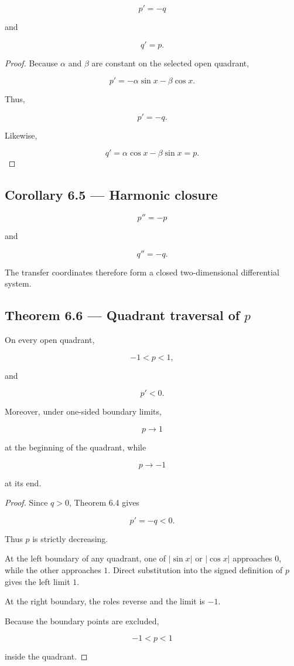 \documentclass[11pt,oneside,openany]{book}
\newcommand{\PCsubsection}[1]{%
  \subsection*{#1}%
}
\begin{document}
\[
\boxed{ p'=-q }
\]

and

\[
\boxed{ q'=p }.
\]

\begin{proof}
Because \(\alpha\) and \(\beta\) are constant on the selected open quadrant,

\[
p' = -\alpha\sin x-\beta\cos x.
\]

Thus,

\[
p'=-q.
\]

Likewise,

\[
q' = \alpha\cos x-\beta\sin x = p.
\]

\end{proof}

\PCsubsection{Corollary 6.5 --- Harmonic closure}

\[
\boxed{ p''=-p }
\]

and

\[
\boxed{ q''=-q }.
\]

The transfer coordinates therefore form a closed two-dimensional differential system.

\PCsubsection{Theorem 6.6 --- Quadrant traversal of \(p\)}

On every open quadrant,

\[
-1<p<1,
\]

and

\[
p'<0.
\]

Moreover, under one-sided boundary limits,

\[
p\longrightarrow1
\]

at the beginning of the quadrant, while

\[
p\longrightarrow-1
\]

at its end.

\begin{proof}
Since \(q>0\), Theorem 6.4 gives

\[
p'=-q<0.
\]

Thus \(p\) is strictly decreasing.

At the left boundary of any quadrant, one of \(|\sin x|\) or \(|\cos x|\) approaches \(0\), while the other approaches \(1\). Direct substitution into the signed definition of \(p\) gives the left limit \(1\).

At the right boundary, the roles reverse and the limit is \(-1\).

Because the boundary points are excluded,

\[
-1<p<1
\]

inside the quadrant.


\end{proof}
\end{document}
